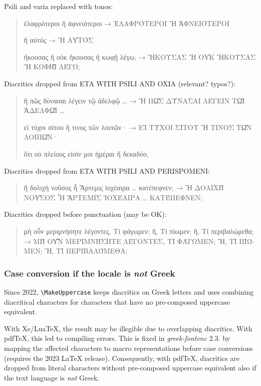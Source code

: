 \documentclass[a4paper]{article}
\newcommand*{\Greek}{\foreignlanguage{greek}}
\newcommand*{\Greek}{\ensuregreek}
\newcommand{\cs}[1]{\texttt{\textbackslash#1}}
\newcommand*{\TestUppercase}[1]{\Greek{#1 → \MakeUppercase{#1}}}
\begin{document}
\medskip\noindent
Psili and varia replaced with tonos:
\begin{quote}
  \TestUppercase{ἐλαφρότεροι ἢ ἀφνειότεροι}

  \TestUppercase{ἢ αὐτός}

  \TestUppercase{ἤκουσας ἢ οὐκ ἤκουσας ἢ κωφῇ λέγω; }
\end{quote}
Diacritics dropped from ETA WITH PSILI AND OXIA (relevant? typos?):
\begin{quote}

  \TestUppercase{ἤ πῶς δύνασαι λέγειν τῷ ἀδελφῷ …}

  \TestUppercase{εἰ τύχοι σίτου ἤ τινος τῶν λοιπῶν·}

  ὅτι οὐ πλείους εἰσίν μοι ἡμέραι ἤ δεκαδύο,
\end{quote}
Diacritics dropped from ETA WITH PSILI AND PERISPOMENI:
\begin{quote}

  \TestUppercase{ἢ δολιχὴ νοῦσος ἦ Ἄρτεμις ἰοχέαιρα … κατέπεφνεν; }

\end{quote}
Diacritics dropped before punctuation (may be OK):
\begin{quote}
  \TestUppercase{μὴ οὖν μεριμνήσητε λέγοντες, Τί φάγωμεν; ἤ, Τί πίωμεν;
                 ἤ, Τί περιβαλώμεθα;}
\end{quote}


\subsubsection{Case conversion if the locale is \emph{not} Greek}

Since 2022, \cs{MakeUppercase} keeps diacritics on Greek letters and uses
combining diacritical characters for characters that have no pre-composed
uppercase equivalent.

With Xe/LuaTeX, the result may be illegible due to overlapping diacritics.
With pdfTeX, this led to compiling errors.
This is fixed in \emph{greek-fontenc} 2.3. by mapping the affected
characters to macro representations before case conversions
(requires the 2023 LaTeX release).
Consequently, with pdfTeX, diacritics are dropped from literal characters
without pre-composed uppercase equivalent also if the text language is
\emph{not} Greek.
\end{document}

